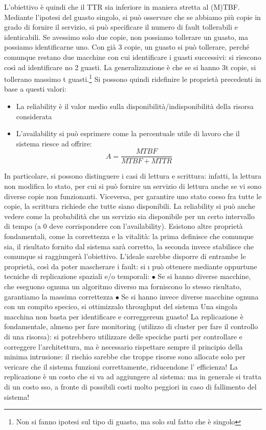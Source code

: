 L'obiettivo è quindi che il TTR sia inferiore in maniera stretta al (M)TBF.
Mediante l'ipotesi del guasto singolo, si può osservare che se abbiamo più copie in grado di fornire il servizio, si
può specificare il numero di fault tollerabili e identicabili. Se avessimo solo due copie, non possiamo tollerare un
guasto, ma possiamo identificarne uno. Con già 3 copie, un guasto si può tollerare,
perché comunque restano due macchine con cui identificare i guasti successivi:
si riescono così ad identificare no 2 guasti. La generalizzazione è che se si hanno 3t copie, si tollerano massimo t
guasti.\footnote{Non si fanno ipotesi sul tipo di guasto, ma solo sul fatto che è singolo} Si possono quindi
ridefinire le proprietà precedenti in base a questi valori:
\begin{itemize}
 \item La reliability è il valor medio sulla disponibilità/indisponibilità della risorsa considerata
 \item L'availability si può esprimere come la percentuale utile di lavoro che il sistema riesce ad offrire:
 \begin{equation}
  A = \frac{MTBF}{MTBF + MTTR}
 \end{equation}
\end{itemize}
In particolare, si possono distinguere i casi di lettura e scrittura: infatti, la lettura non modifica lo stato, per
cui si può fornire un servizio di lettura anche se vi sono diverse copie non funzionanti. Viceversa, per garantire uno
stato coeso fra tutte le copie, la scrittura richiede che tutte siano disponibili.
La reliability si può anche vedere come la probabilità che un servizio sia disponibile per un certo intervallo di 
tempo (a 0 deve corrispondere con l'availability).
Esistono altre proprietà fondamentali, come la correttezza e la vitalità: la prima definisce che comunque sia, il
risultato fornito dal sistema sarà corretto, la seconda invece stabilisce che comunque si raggiungerà l'obiettivo.
L'ideale
sarebbe disporre di entrambe le proprietà, così da poter mascherare i fault: si
\i{}
può ottenere mediante oppurtune tecniche di replicazione spaziali e/o temporali:
$\bullet$ Se si hanno diverse macchine, che eseguono ognuna un algoritmo diverso
ma forniscono lo stesso risultato, garantiamo la massima correttezza
$\bullet$ Se si hanno invece diverse macchine ognuna con un compito specico, si
ottimizzalo throughput del sistema
Una singola macchina non basta per identificare e correggereun guasto! La
replicazione è fondamentale, almeno per fare monitoring (utilizzo di cluster per
fare il controllo di una risorsa): si potrebbero utilizzare delle speciche parti
per controllare e correggere l'architettura, ma è necessario rispettare sempre il
principio della minima intrusione: il rischio sarebbe che troppe risorse sono
allocate solo per vericare che il sistema funzioni correttamente, riducendone l'
efficienza! La replicazione è un costo che si va ad aggiungere al sistema: ma in
generale si tratta di un costo sso, a fronte di possibili costi molto peggiori in
caso di fallimento del sistema!
